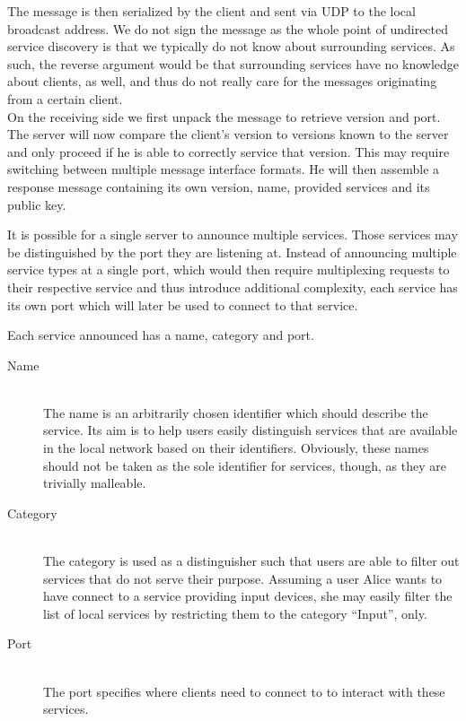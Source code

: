 The message is then serialized by the client and sent via UDP to the local broadcast address.
We do not sign the message as the whole point of undirected service discovery is that we typically do not know about surrounding services.
As such, the reverse argument would be that surrounding services have no knowledge about clients, as well, and thus do not really care for the messages originating from a certain client.\\

On the receiving side we first unpack the message to retrieve version and port.
The server will now compare the client's version to versions known to the server and only proceed if he is able to correctly service that version.
This may require switching between multiple message interface formats.
He will then assemble a response message containing its own version, name, provided services and its public key.

It is possible for a single server to announce multiple services.
Those services may be distinguished by the port they are listening at.
Instead of announcing multiple service types at a single port, which would then require multiplexing requests to their respective service and thus introduce additional complexity, each service has its own port which will later be used to connect to that service.

Each service announced has a name, category and port.
\begin{description}
    \item[Name]\hfill\\
        The name is an arbitrarily chosen identifier which should describe the service.
        Its aim is to help users easily distinguish services that are available in the local network based on their identifiers.
        Obviously, these names should not be taken as the sole identifier for services, though, as they are trivially malleable.
    \item[Category]\hfill\\
        The category is used as a distinguisher such that users are able to filter out services that do not serve their purpose.
        Assuming a user Alice wants to have connect to a service providing input devices, she may easily filter the list of local services by restricting them to the category ``Input'', only.
    \item[Port]\hfill\\
        The port specifies where clients need to connect to to interact with these services.
\end{description}


